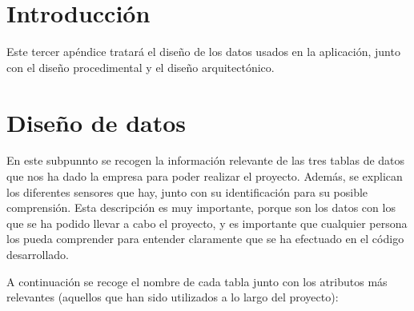 
\section{Introducción}
Este tercer apéndice tratará el diseño de los datos usados en la aplicación, junto con el diseño procedimental y el diseño arquitectónico.

\section{Diseño de datos}
En este subpunnto se recogen la información relevante de las tres tablas de datos que nos ha dado la empresa para poder realizar el proyecto. Además, se explican los diferentes sensores que hay, junto con su identificación para su posible comprensión. Esta descripción es muy importante, porque son los datos con los que se ha podido llevar a cabo el proyecto, y es importante que cualquier persona los pueda comprender para entender claramente que se ha efectuado en el código desarrollado.

A continuación se recoge el nombre de cada tabla junto con los atributos más relevantes (aquellos que han sido utilizados a lo largo del proyecto):

